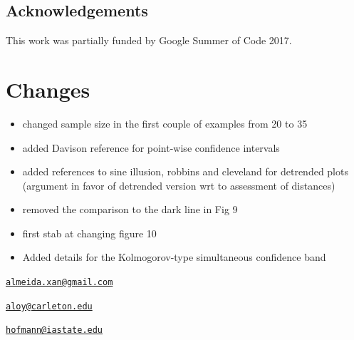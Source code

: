 

\subsection{Acknowledgements}\label{acknowledgements}

This work was partially funded by Google Summer of Code 2017.

\section{Changes}\label{changes}

\begin{itemize}
\tightlist
\item
  changed sample size in the first couple of examples from 20 to 35
\item
  added Davison reference for point-wise confidence intervals
\item
  added references to sine illusion, robbins and cleveland for detrended
  plots (argument in favor of detrended version wrt to assessment of
  distances)
\item
  removed the comparison to the dark line in Fig 9
\item
  first stab at changing figure 10
\item
  Added details for the Kolmogorov-type simultaneous confidence band
\end{itemize}

\address{%
Alexandre Almeida\\
University of Campinas\\
Institute of Computing\\ Campinas, Brazil 13083-852\\
}
\href{mailto:almeida.xan@gmail.com}{\nolinkurl{almeida.xan@gmail.com}}

\address{%
Adam Loy\\
Carleton College\\
Department of Mathematics and Statistics\\ Northfield, MN 55057\\
}
\href{mailto:aloy@carleton.edu}{\nolinkurl{aloy@carleton.edu}}

\address{%
Heike Hofmann\\
Iowa State University\\
Department of Statistics\\ Ames, IA 50011-1210\\
}
\href{mailto:hofmann@iastate.edu}{\nolinkurl{hofmann@iastate.edu}}

